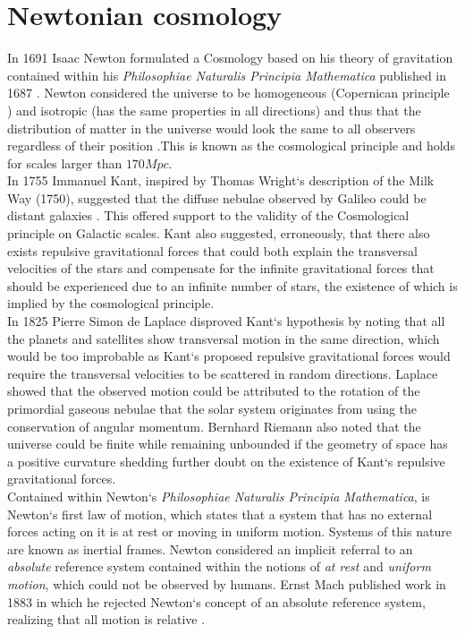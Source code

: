 \documentclass[a4paper, 11pt]{FSKH_623_Report}
\numberwithin{equation}{section}
\begin{document}
\section{Newtonian cosmology}
In 1691 Isaac Newton formulated a Cosmology based on his theory of gravitation contained within his \textit{Philosophiae Naturalis Principia Mathematica} published in 1687 \citep{ITC}.
Newton considered the universe to be homogeneous (Copernican principle \citep{calcagni2017classical}) and isotropic (has the same properties in all directions) and thus that the distribution of matter in the universe would look the same to all observers regardless of their position \citep{ITC}.This is known as the cosmological principle and holds for scales larger than $170Mpc$\citep{ITC}.\\
In 1755 Immanuel Kant, inspired by Thomas Wright`s description of the Milk Way (1750), suggested that the diffuse nebulae observed by Galileo could be distant galaxies \citep{ITC}. This offered support to the validity of the Cosmological principle on Galactic scales. Kant also suggested, erroneously, that there also exists repulsive gravitational forces that could both explain the transversal velocities of the stars and compensate for the infinite gravitational forces that should be experienced due to an infinite number of stars, the existence of which is implied by the cosmological principle. \\
In 1825 Pierre Simon de Laplace disproved Kant`s hypothesis by noting that all the planets and satellites show transversal motion in the same direction, which would be too improbable as Kant`s proposed repulsive gravitational forces would require the transversal velocities to be scattered in random directions\citep{ITC}. Laplace showed that the observed motion could be attributed to the rotation of the primordial gaseous nebulae that the solar system originates from using the conservation of angular momentum. Bernhard Riemann also noted that the universe could be finite while remaining unbounded if the geometry of space has a positive curvature shedding further doubt on the existence of Kant`s repulsive gravitational forces.\\
Contained within Newton`s \textit{Philosophiae Naturalis Principia Mathematica}, is Newton`s first law of motion, which states that a system that has no external forces acting on it is at rest or moving in uniform motion. Systems of this nature are known as inertial frames. Newton considered an implicit referral to an \textit{absolute} reference system contained within the notions of \textit{at rest} and \textit{uniform motion}, which could not be observed by humans. Ernst Mach published work in 1883 in which he rejected Newton`s concept of an absolute reference system, realizing that all motion is relative \citep{ITC}. \\ 
\end{document}
